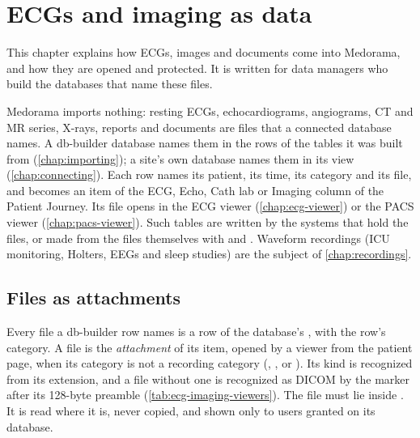 \chapter{ECGs and imaging as data}
\label{chap:ecg-imaging}

This chapter explains how ECGs, images and documents come into Medorama, and how they are
opened and protected. It is written for data managers who build the databases that name these
files.

Medorama imports nothing: resting ECGs, echocardiograms, angiograms, CT and MR series, X-rays,
reports and documents are files that a connected database names. A db-builder database names
them in the rows of the tables it was built from (\cref{chap:importing}); a site's own database
names them in its  view (\cref{chap:connecting}). Each row names its patient,
its time, its category and its file, and becomes an item of the ECG, Echo, Cath lab or Imaging
column of the Patient Journey. Its file opens in the ECG viewer (\cref{chap:ecg-viewer}) or the PACS
viewer (\cref{chap:pacs-viewer}). Such tables are written by the systems that hold the files, or
made from the files themselves with  and . Waveform
recordings (ICU monitoring, Holters, EEGs and sleep studies) are the subject of
\cref{chap:recordings}.

\section{Files as attachments}
\label{sec:ecg-imaging-files}

Every file a db-builder row names is a row of the database's , with the row's
category. A file is the \emph{attachment} of its item, opened by a viewer from the patient page,
when its category is not a recording category (, ,  or
). Its kind is
recognized from its extension, and a file without one is recognized as DICOM by the 
marker after its 128-byte preamble (\cref{tab:ecg-imaging-viewers}). The file must lie inside
. It is read where it is, never copied, and shown only to users granted
 on its database.

